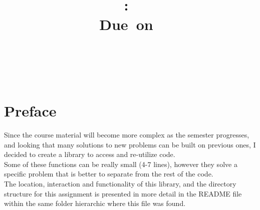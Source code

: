 \documentclass{article}
\title{
\vspace{2in}
\textmd{\textbf{\hmwkClass:\ \hmwkTitle}}\\
\normalsize\vspace{0.1in}\small{Due\ on\ \hmwkDueDate}\\
\vspace{0.1in}\large{\textit{\hmwkClassInstructor\ }}
\vspace{3in}
}
\author{\textbf{\hmwkAuthorName} \\ \hmwkAuthorEmail}
\date{} %
\begin{document}
\clearpage\maketitle
\thispagestyle{empty}



\newpage
\clearpage\tableofcontents
\listoffigures
\listoftables

\thispagestyle{empty}
\newpage
\setcounter{page}{1}
\section{Preface} %
\vspace*{10pt} %
Since the course material will become more complex as the semester progresses, and looking that many solutions to new problems can be built on previous ones, I decided to create a library to access and re-utilize code.\\

Some of these functions can be really small (4-7 lines), however they solve a specific problem that is better to separate from the rest of the code.\\

The location, interaction and functionality of this library, and the directory structure for this assignment is presented in more detail in the README file within the same folder hierarchic where this file was found.
\end{document}

